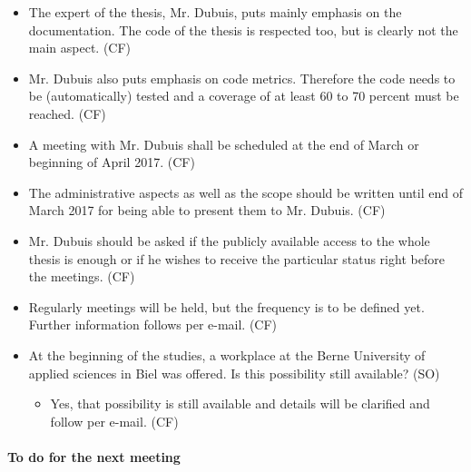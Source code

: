 \documentclass[10pt, openright, notitlepage]{scrreprt}
\begin{document}
\begin{itemize}
\item The expert of the thesis, Mr. Dubuis, puts mainly emphasis on the
documentation. The code of the thesis is respected too, but is clearly not the
main aspect. (CF)
\item Mr. Dubuis also puts emphasis on code metrics. Therefore the code needs to be
(automatically) tested and a coverage of at least 60 to 70 percent must be
reached. (CF)
\item A meeting with Mr. Dubuis shall be scheduled at the end of March or beginning
of April 2017. (CF)
\item The administrative aspects as well as the scope should be written until end of
March 2017 for being able to present them to Mr. Dubuis. (CF)
\item Mr. Dubuis should be asked if the publicly available access to the whole
thesis is enough or if he wishes to receive the particular status right before
the meetings. (CF)
\item Regularly meetings will be held, but the frequency is to be defined yet.
Further information follows per e-mail. (CF)
\item At the beginning of the studies, a workplace at the Berne University of
applied sciences in Biel was offered. Is this possibility still available?
(SO)
\begin{itemize}
\item Yes, that possibility is still available and details will be clarified and
follow per e-mail. (CF)
\end{itemize}
\end{itemize}

\paragraph{To do for the next meeting}
\label{sec:orgc81c64b}
\end{document}
